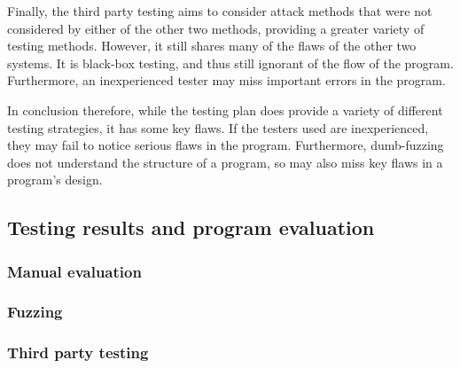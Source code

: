 Finally, the third party testing aims to consider attack methods that were not considered by either of the other two methods, providing a greater variety of testing methods. However, it still shares many of the flaws of the other two systems. It is black-box testing, and thus still ignorant of the flow of the program. Furthermore, an inexperienced tester may miss important errors in the program. 

In conclusion therefore, while the testing plan does provide a variety of different testing strategies, it has some key flaws. If the testers used are inexperienced, they may fail to notice serious flaws in the program. Furthermore, dumb-fuzzing does not understand the structure of a program, so may also miss key flaws in a program's design. 

\subsection{Testing results and program evaluation}



\subsubsection{Manual evaluation}



\subsubsection{Fuzzing}



\subsubsection{Third party testing}

